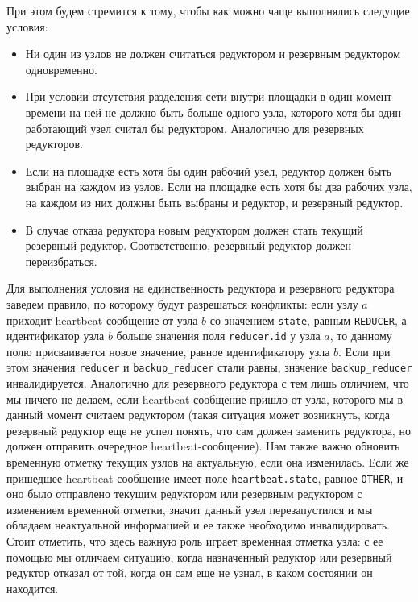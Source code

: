 \documentclass{article}
\theoremstyle{plain}
\theoremstyle{plain}
\theoremstyle{plain}
\theoremstyle{plain}
\theoremstyle{definition}
\theoremstyle{remark}
\theoremstyle{plain}
\begin{document}
При этом будем стремится к тому, чтобы как можно чаще выполнялись следущие условия:

\begin{itemize}
    \item Ни один из узлов не должен считаться редуктором и резервным редуктором одновременно.

    \item При условии отсутствия разделения сети \cite[стр.~2]{CAP_Theorem} внутри площадки в один момент времени на ней не должно быть больше одного узла, которого хотя бы один работающий узел считал бы редуктором. Аналогично для резервных редукторов.
    
    \item Если на площадке есть хотя бы один рабочий узел, редуктор должен быть выбран на каждом из узлов. Если на площадке есть хотя бы два рабочих узла, на каждом из них должны быть выбраны и редуктор, и резервный редуктор.
    
    \item В случае отказа редуктора новым редуктором должен стать текущий резервный редуктор. Соответственно, резервный редуктор должен переизбраться.
\end{itemize}

Для выполнения условия на единственность редуктора и резервного редуктора заведем правило, по которому будут разрешаться конфликты: если узлу $a$ приходит heartbeat-сообщение от узла $b$ со значением \texttt{state}, равным \texttt{REDUCER}, а идентификатор узла $b$ больше значения поля \texttt{reducer.id} у узла $a$, то данному полю присваивается новое значение, равное идентификатору узла $b$. Если при этом значения \texttt{reducer} и \texttt{backup\_reducer} стали равны, значение \texttt{backup\_reducer} инвалидируется. Аналогично для резервного редуктора с тем лишь отличием, что мы ничего не делаем, если heartbeat-сообщение пришло от узла, которого мы в данный момент считаем редуктором (такая ситуация может возникнуть, когда резервный редуктор еще не успел понять, что сам должен заменить редуктора, но должен отправить очередное heartbeat-сообщение). Нам также важно обновить временную отметку текущих узлов на актуальную, если она изменилась. Если же пришедшее heartbeat-сообщение имеет поле \texttt{heartbeat.state}, равное \texttt{OTHER}, и оно было отправлено текущим редуктором или резервным редуктором с изменением временной отметки, значит данный узел перезапустился и мы обладаем неактуальной информацией и ее также необходимо инвалидировать. Стоит отметить, что здесь важную роль играет временная отметка узла: с ее помощью мы отличаем ситуацию, когда назначенный редуктор или резервный редуктор отказал от той, когда он сам еще не узнал, в каком состоянии он находится.
\end{document}
